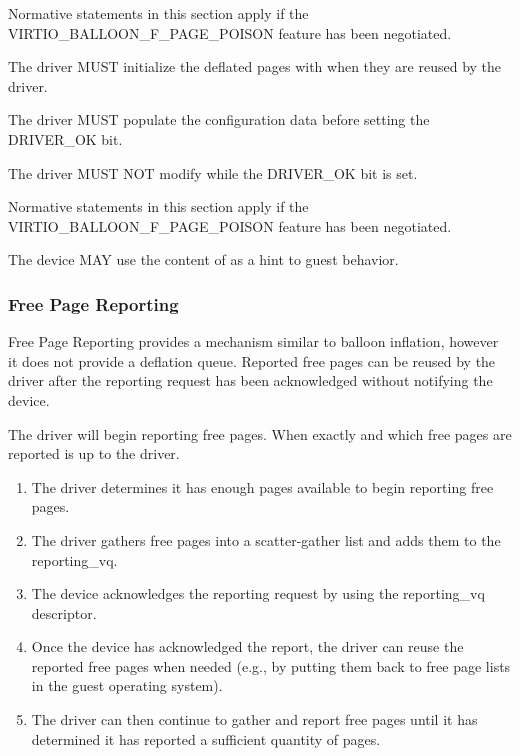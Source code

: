 Normative statements in this section apply if the
VIRTIO_BALLOON_F_PAGE_POISON feature has been negotiated.

The driver MUST initialize the deflated pages with  when
they are reused by the driver.

The driver MUST populate the  configuration data before
setting the DRIVER_OK bit.

The driver MUST NOT modify  while the DRIVER_OK bit is set.


Normative statements in this section apply if the
VIRTIO_BALLOON_F_PAGE_POISON feature has been negotiated.

The device MAY use the content of  as a hint to guest
behavior.

\subsubsection{Free Page Reporting}\label{sec:Device Types / Memory Balloon Device / Device Operation / Free Page Reporting}

Free Page Reporting provides a mechanism similar to balloon inflation,
however it does not provide a deflation queue. Reported free pages can
be reused by the driver after the reporting request has been acknowledged
without notifying the device.

The driver will begin reporting free pages. When exactly and which free
pages are reported is up to the driver.

\begin{enumerate}

\item The driver determines it has enough pages available to begin
  reporting free pages.

\item The driver gathers free pages into a scatter-gather list and adds
  them to the reporting_vq.

\item The device acknowledges the reporting request by using the
  reporting_vq descriptor.

\item Once the device has acknowledged the report, the driver can reuse the
  reported free pages when needed (e.g., by putting them back to free page
  lists in the guest operating system).

\item The driver can then continue to gather and report free pages until it
  has determined it has reported a sufficient quantity of pages.

\end{enumerate}

